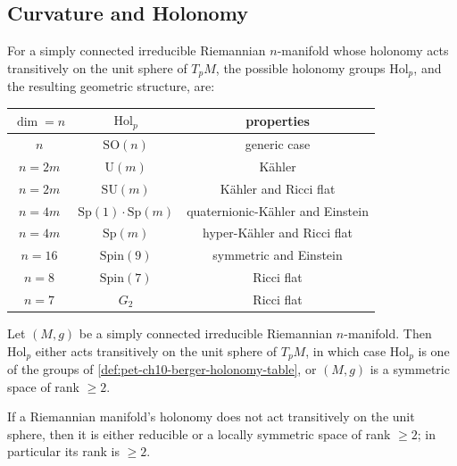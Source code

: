 \subsection{Curvature and Holonomy}

\begin{definition}
  \label{def:pet-ch10-berger-holonomy-table}
  For a simply connected irreducible Riemannian $n$-manifold whose holonomy
  acts transitively on the unit sphere of $T_pM$, the possible holonomy groups
  $\mathrm{Hol}_p$, and the resulting geometric structure, are:
  \begin{center}
    \begin{tabular}{c|c|c}
      $\dim=n$ & $\mathrm{Hol}_p$ & properties \\\hline
      $n$ & $\mathrm{SO}(n)$ & generic case \\
      $n=2m$ & $\mathrm U(m)$ & Kähler \\
      $n=2m$ & $\mathrm{SU}(m)$ & Kähler and Ricci flat \\
      $n=4m$ & $\mathrm{Sp}(1)\cdot\mathrm{Sp}(m)$ & quaternionic-Kähler and Einstein \\
      $n=4m$ & $\mathrm{Sp}(m)$ & hyper-Kähler and Ricci flat \\
      $n=16$ & $\mathrm{Spin}(9)$ & symmetric and Einstein \\
      $n=8$ & $\mathrm{Spin}(7)$ & Ricci flat \\
      $n=7$ & $G_2$ & Ricci flat
    \end{tabular}
  \end{center}
\end{definition}

\begin{theorem}
  \label{thm:pet-ch10-berger-simons-classification}
  Let $(M,g)$ be a simply connected irreducible Riemannian $n$-manifold. Then
  $\mathrm{Hol}_p$ either acts transitively on the unit sphere of $T_pM$, in
  which case $\mathrm{Hol}_p$ is one of the groups of
  \cref{def:pet-ch10-berger-holonomy-table}, or $(M,g)$ is a symmetric space of
  rank $\ge2$.
\end{theorem}

\begin{corollary}
  \label{cor:pet-ch10-nontransitive-holonomy}
  If a Riemannian manifold's holonomy does not act transitively on the unit
  sphere, then it is either reducible or a locally symmetric space of rank
  $\ge2$; in particular its rank is $\ge2$.
\end{corollary}

